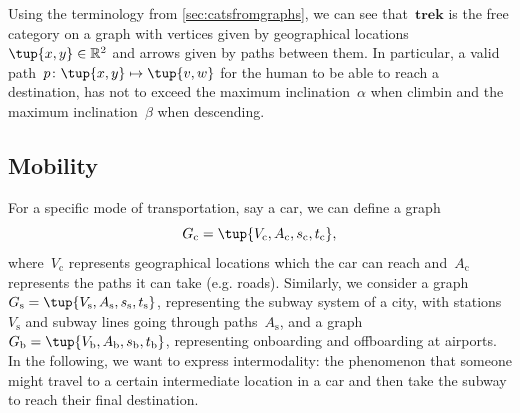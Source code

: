 {Using the terminology from \cref{sec:catsfromgraphs}, we can see that~$\mathbf{trek}$ is the free category on a graph with vertices given by geographical locations~$\tup{x,y}\in \mathbb{R}^2$ and arrows given by paths between them. In particular, a valid path~$p\colon \tup{x,y}\mapsto \tup{v,w}$ for the human to be able to reach a destination, has not to exceed the maximum inclination~$\alpha$ when climbin and the maximum inclination~$\beta$ when descending.
}

\subsection{Mobility}

For a specific mode of transportation, say a car, we can define a graph
\begin{equation*}
    G_\mathrm{c}=\tup{V_\mathrm{c},A_\mathrm{c},s_\mathrm{c},t_\mathrm{c}},
\end{equation*} where~$V_\mathrm{c}$ represents geographical locations which the car can reach and~$A_\mathrm{c}$ represents the paths it can take (e.g. roads). Similarly, we consider a graph~$G_\mathrm{s}=\tup{V_\mathrm{s},A_\mathrm{s},s_\mathrm{s},t_\mathrm{s}}$, representing the subway system of a city, with stations~$V_\mathrm{s}$ and subway lines going through paths~$A_\mathrm{s}$, and a graph $G_\mathrm{b}=\tup{V_\mathrm{b},A_\mathrm{b},s_\mathrm{b},t_\mathrm{b}}$, representing onboarding and offboarding at airports. In the following, we want to express intermodality: the phenomenon that someone might travel to a certain intermediate location in a car and then take the subway to reach their final destination.

